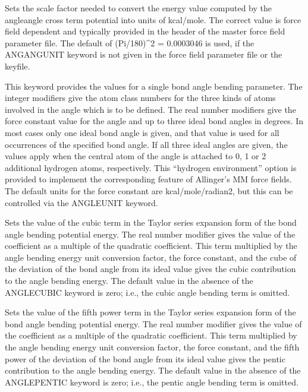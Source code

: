 \documentclass[letterpaper,11pt,english]{sphinxmanual}
\begin{document}
  Sets the scale factor needed to convert the energy value computed by the angle\sphinxhyphen{}angle cross term potential into units of kcal/mole. The correct value is force field dependent and typically provided in the header of the master force field parameter file. The default of (Pi/180)\textasciicircum{}2 = 0.0003046 is used, if the ANGANGUNIT keyword is not given in the force field parameter file or the keyfile.

  This keyword provides the values for a single bond angle bending parameter. The integer modifiers give the atom class numbers for the three kinds of atoms involved in the angle which is to be defined. The real number modifiers give the force constant value for the angle and up to three ideal bond angles in degrees. In most cases only one ideal bond angle is given, and that value is used for all occurrences of the specified bond angle. If all three ideal angles are given, the values apply when the central atom of the angle is attached to 0, 1 or 2 additional hydrogen atoms, respectively. This “hydrogen environment” option is provided to implement the corresponding feature of Allinger’s MM force fields. The default units for the force constant are kcal/mole/radian2, but this can be controlled via the ANGLEUNIT keyword.

  Sets the value of the cubic term in the Taylor series expansion form of the bond angle bending potential energy. The real number modifier gives the value of the coefficient as a multiple of the quadratic coefficient. This term multiplied by the angle bending energy unit conversion factor, the force constant, and the cube of the deviation of the bond angle from its ideal value gives the cubic contribution to the angle bending energy. The default value in the absence of the ANGLE\sphinxhyphen{}CUBIC keyword is zero; i.e., the cubic angle bending term is omitted.

  Sets the value of the fifth power term in the Taylor series expansion form of the bond angle bending potential energy. The real number modifier gives the value of the coefficient as a multiple of the quadratic coefficient. This term multiplied by the angle bending energy unit conversion factor, the force constant, and the fifth power of the deviation of the bond angle from its ideal value gives the pentic contribution to the angle bending energy. The default value in the absence of the ANGLE\sphinxhyphen{}PENTIC keyword is zero; i.e., the pentic angle bending term is omitted.
\end{document}
